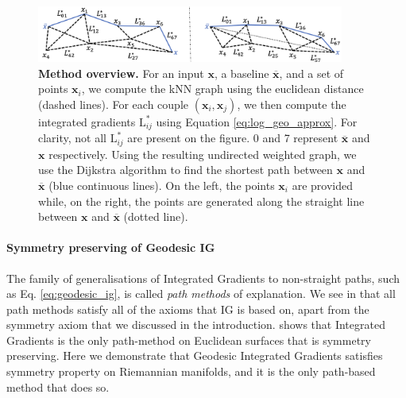 \begin{figure}[t]
\vskip 0.2in
\begin{center}
\centerline{\includegraphics[width=0.9\textwidth]{figures/method.png}}
\caption{\textbf{Method overview.} For an input $\textbf{x}$, a baseline $\overline{\textbf{x}}$, and a set of points $\textbf{x}_i$, we compute the kNN graph using the euclidean distance (dashed lines). For each couple $(\textbf{x}_i, \textbf{x}_j)$, we then compute the integrated gradients $\textrm{L}^*_{ij}$ using Equation \ref{eq:log_geo_approx}. For clarity, not all $\textrm{L}^*_{ij}$ are present on the figure. 0 and 7 represent $\overline{\textbf{x}}$ and $\textbf{x}$ respectively. Using the resulting undirected weighted graph, we use the Dijkstra algorithm to find the shortest path between $\textbf{x}$ and $\overline{\textbf{x}}$ (blue continuous lines). On the left, the points $\textbf{x}_i$ are provided while, on the right, the points are generated along the straight line between $\textbf{x}$ and $\overline{\textbf{x}}$ (dotted line).}
\label{fig:method}
\end{center}
\vskip -0.2in
\end{figure}

\paragraph{Symmetry preserving of Geodesic IG}

The family of generalisations of Integrated Gradients to non-straight paths, such as Eq. \ref{eq:geodesic_ig}, is called \emph{path methods} of explanation. We see in \citet{sundararajan2017axiomatic} that all path methods satisfy all of the axioms that IG is based on, apart from the symmetry axiom that we discussed in the introduction. \citet[Theorem 1]{sundararajan2017axiomatic} shows that Integrated Gradients is the only path-method on Euclidean surfaces that is symmetry preserving. Here we demonstrate that Geodesic Integrated Gradients satisfies symmetry property on Riemannian manifolds, and it is the only path-based method that does so. 


